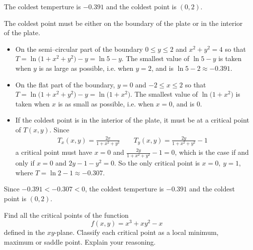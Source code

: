 
\begin{answer}
The coldest temperture is $-0.391$ and the coldest point is $(0,2)$.
\end{answer}

\begin{solution}
The coldest point must be either on the boundary of the plate
or in the interior of the plate. 
\begin{itemize}
\item 
On the semi--circular part of the boundary $0\le y\le 2$ and
$x^2+y^2=4$ so that $T=\ln\big(1+x^2+y^2\big)-y=\ln 5-y$. The smallest
value of $\ln 5-y$ is taken when $y$ is as large as possible, 
i.e. when $y=2$, and is $\ln 5 -2\approx -0.391$.

\item 
On the flat part of the boundary, $y=0$ and
$-2\le x\le 2$ so that $T=\ln\big(1+x^2+y^2\big)-y=\ln\big(1+x^2\big)$. 
The smallest value of $\ln\big(1+x^2\big)$ is taken when $x$ is as small as possible, i.e. when $x=0$, and is $0$.

\item 
If the coldest point is in the interior of the plate,
it must be at a critical point of $T(x,y)$. Since
\begin{align*}
T_x(x,y)=\frac{2x}{1+x^2+y^2}\qquad 
T_y(x,y)=\frac{2y}{1+x^2+y^2}-1
\end{align*}
a critical point must have $x=0$ and $\frac{2y}{1+x^2+y^2}-1=0$,
which is the case if and only if $x=0$ and $2y-1-y^2=0$. So the only 
critical point is $x=0,\ y=1$, where $T=\ln 2-1\approx -0.307$.
\end{itemize}
Since $-0.391<-0.307<0$, the coldest temperture is $-0.391$ and the
coldest point is $(0,2)$.
\end{solution}

\begin{question}[M200 2001D] %
Find all the critical points of the function 
\begin{equation*}
f(x,y)=x^3+xy^2-x
\end{equation*}
defined in the $xy$-plane. Classify each critical point as a local minimum,
 maximum or saddle point. Explain your reasoning.
\end{question}

%


